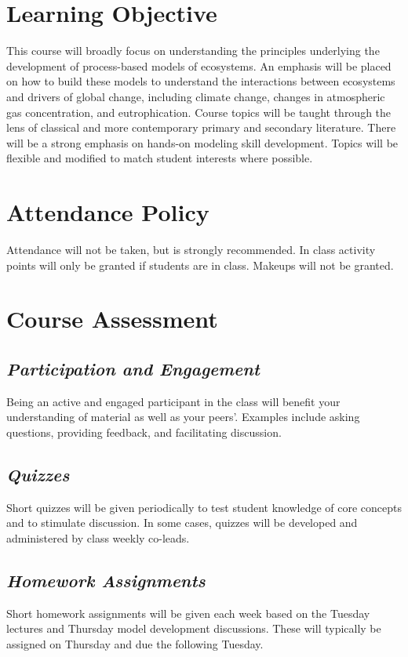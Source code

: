 \documentclass[12pt, notitlepage]{article}   	%
\begin{document}
{\section{Learning Objective}
This course will broadly focus on understanding the principles underlying the development of
process-based models of ecosystems. An emphasis will be placed on how to build these
models to understand the interactions between ecosystems and drivers of global
change, including climate change, changes in atmospheric gas concentration, and eutrophication.
Course topics will be taught through the lens of classical and more contemporary 
primary and secondary literature. There will be a strong emphasis on hands-on modeling skill
development. Topics will be flexible and modified to match student interests where possible.

\section{Attendance Policy}
Attendance will not be taken, but is strongly recommended. 
In class activity points will only be granted if students are in class.
Makeups will not be granted.

\section{Course Assessment}
\subsection{\textit{Participation and Engagement}}
Being an active and engaged participant in the class will benefit your understanding
of material as well as your peers'. Examples include asking questions, providing feedback,
and facilitating discussion.

\subsection{\textit{Quizzes}}
Short quizzes will be given periodically to test student knowledge of core concepts and to
stimulate discussion. In some cases, quizzes will be developed and administered
by class weekly co-leads.

\subsection{\textit{Homework Assignments}}
Short homework assignments will be given each week based on the Tuesday lectures and
Thursday model development discussions. These will typically be assigned on Thursday and
due the following Tuesday.

}
\end{document}
